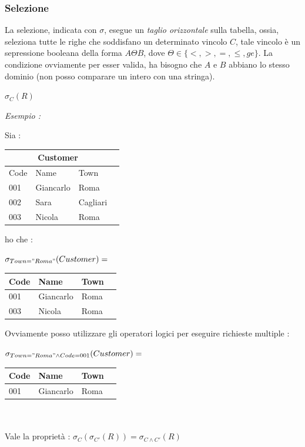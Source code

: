\documentclass[12pt, letterpaper]{article}
\begin{document}
\subsubsection{Selezione}
La selezione, indicata con \(\sigma\), esegue un \textit{taglio orizzontale} sulla tabella, ossia, seleziona tutte le righe 
che soddisfano un determinato vincolo \(C\), tale vincolo è un sepressione booleana della forma 
\(A\Theta B\), dove \(\Theta\in\{<,>,=,\le,ge\}\). La condizione ovviamente per esser valida, ha bisogno 
che \(A\) e \(B\) abbiano lo stesso dominio (non posso comparare un intero con una stringa).\begin{center}
    \( \sigma_{C}(R)\)
\end{center}
\textit{Esempio :}\begin{center} Sia : 
    \begin{tabular}{|l|l|l|r|}
        \hline
    \multicolumn{3}{|c|}{\textbf{Customer}}\\
        \hline
        Code & Name & Town \\
        \hline
        001 & Giancarlo & Roma \\
        \hline
        002 & Sara & Cagliari \\
        \hline
        003 & Nicola & Roma \\
        \hline
        \end{tabular}
        ho che :\end{center}\begin{center}  \( \sigma_{Town="Roma"}(Customer)=\)
        \begin{tabular}{|l|l|l|r|}
            \hline
   
            Code & Name & Town \\
            \hline
            001 & Giancarlo & Roma \\
            \hline
            003 & Nicola & Roma \\
            \hline
            \end{tabular}
\end{center}
Ovviamente posso utilizzare gli operatori logici per eseguire richieste multiple :
\begin{center}  \( \sigma_{Town="Roma"\land Code=001}(Customer)=\)
    \begin{tabular}{|l|l|l|r|}
        
        \hline
        Code & Name & Town \\
        \hline
        001 & Giancarlo & Roma \\
        \hline
        \end{tabular}
        \\\hphantom{.}\\Vale la proprietà : \(\sigma_{C}(\sigma_{C'}(R))=\sigma_{C\land C'}(R)\)
    \end{center}
\end{document}
